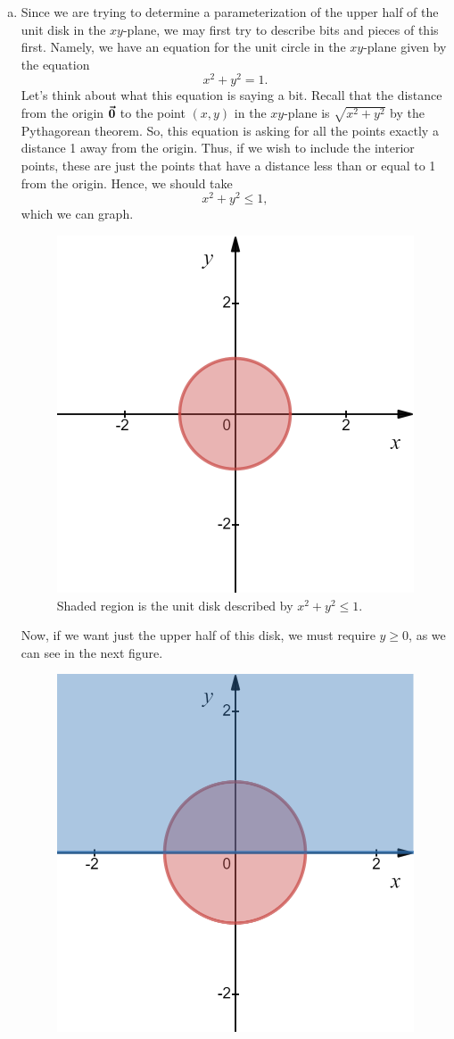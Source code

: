 \documentclass[12pt]{article} %
\begin{document}
\begin{solution}
\begin{enumerate}[(a)]
    \item Since we are trying to determine a parameterization of the upper half of the unit disk in the $xy$-plane, we may first try to describe bits and pieces of this first. Namely, we have an equation for the unit circle in the $xy$-plane given by the equation
    \[
    x^2+y^2 = 1.
    \]
    Let's think about what this equation is saying a bit. Recall that the distance from the origin $\boldsymbol{\vec{0}}$ to the point $(x,y)$ in the $xy$-plane is $\sqrt{x^2+y^2}$ by the Pythagorean theorem. So, this equation is asking for all the points exactly a distance 1 away from the origin. Thus, if we wish to include the interior points, these are just the points that have a distance less than or equal to 1 from the origin. Hence, we should take
    \[
    x^2+y^2\leq 1,
    \]
    which we can graph.
    \begin{figure}[H]
        \centering
        \includegraphics[width=.6\textwidth]{figures/disk.png}
        \caption{Shaded region is the unit disk described by $x^2+y^2\leq 1$.}
    \end{figure}
    Now, if we want just the upper half of this disk, we must require $y\geq 0$, as we can see in the next figure.
    \begin{figure}[H]
        \centering
        \includegraphics[width=.6\textwidth]{figures/disk_2.png}

\end{figure}
\end{enumerate}
\end{solution}
\end{document}
